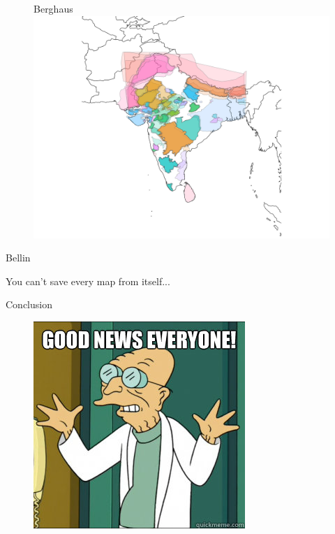 \documentclass{beamer}
\begin{document}
\begin{frame}{}

	\begin{figure}[htpb]{Berghaus}
		\centering
		\includegraphics[width=\linewidth]{img/MicrosoftTeams-image.png}
		\label{Berghaus}
	\end{figure}

\end{frame}

\begin{frame}{Bellin}

You can't save every map from itself...

\end{frame}

\begin{frame}{}



\end{frame}

\begin{frame}{Conclusion}

\begin{figure}[htpb]{}
	\centering
	\includegraphics[width=.7\linewidth]{img/goodnews.png}
	\label{}
\end{figure}		

\end{frame}
\end{document}
